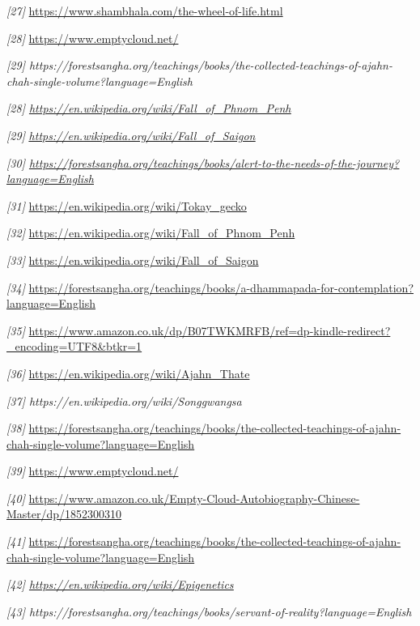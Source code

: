 \emph{{[}27{]}} \url{https://www.shambhala.com/the-wheel-of-life.html}

\emph{{[}28{]}} \url{https://www.emptycloud.net/}

\emph{{[}29{]}
https://forestsangha.org/teachings/books/the-collected-teachings-of-ajahn-chah-single-volume?language=English}

\emph{{[}28{]}
\href{https://en.wikipedia.org/wiki/Fall_of_Phnom_Penh}{\underline{https://en.wikipedia.org/wiki/Fall\_of\_Phnom\_Penh}}}

\emph{{[}29{]}}
\href{https://en.wikipedia.org/wiki/Fall_of_Saigon}{\emph{\underline{https://en.wikipedia.org/wiki/Fall\_of\_Saigon}}}

\emph{{[}30{]}
\href{https://forestsangha.org/teachings/books/alert-to-the-needs-of-the-journey?language=English}{\underline{https://forestsangha.org/teachings/books/alert-to-the-needs-of-the-journey?language=English}}}

\emph{{[}31{]}} \url{https://en.wikipedia.org/wiki/Tokay_gecko}

\emph{{[}32{]}} \url{https://en.wikipedia.org/wiki/Fall_of_Phnom_Penh}

\emph{{[}33{]}} \url{https://en.wikipedia.org/wiki/Fall_of_Saigon}

\emph{{[}34{]}}
\url{https://forestsangha.org/teachings/books/a-dhammapada-for-contemplation?language=English}

\emph{{[}35{]}}
\url{https://www.amazon.co.uk/dp/B07TWKMRFB/ref=dp-kindle-redirect?_encoding=UTF8\&btkr=1}

\emph{{[}36{]}} \url{https://en.wikipedia.org/wiki/Ajahn_Thate}

\emph{{[}37{]} https://en.wikipedia.org/wiki/Songgwangsa}

\emph{{[}38{]}}
\url{https://forestsangha.org/teachings/books/the-collected-teachings-of-ajahn-chah-single-volume?language=English}

\emph{{[}39{]}} \url{https://www.emptycloud.net/}

\emph{{[}40{]}}
\url{https://www.amazon.co.uk/Empty-Cloud-Autobiography-Chinese-Master/dp/1852300310}

\emph{{[}41{]}}
\url{https://forestsangha.org/teachings/books/the-collected-teachings-of-ajahn-chah-single-volume?language=English}

\emph{{[}42{]}
\href{https://en.wikipedia.org/wiki/Epigenetics}{\underline{https://en.wikipedia.org/wiki/Epigenetics}}}

\emph{{[}43{]}
https://forestsangha.org/teachings/books/servant-of-reality?language=English}

